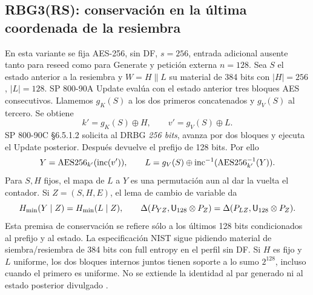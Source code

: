 \subsection{RBG3(RS): conservación en la última coordenada de la resiembra}
En esta variante se fija AES-256, sin DF, $s=256$, entrada adicional
ausente tanto para reseed como para Generate y petición externa $n=128$.
Sea $S$ el estado anterior a la resiembra y $W=H\|L$ su material de
384 bits con $|H|=256$, $|L|=128$. SP 800-90A Update evalúa con el
estado anterior tres bloques AES consecutivos. Llamemos $g_K(S)$ a
los dos primeros concatenados y $g_V(S)$ al tercero. Se obtiene
\[
 k'=g_K(S)\oplus H,\qquad v'=g_V(S)\oplus L .
\]
SP 800-90C §6.5.1.2 solicita al DRBG \emph{256 bits}, avanza por dos
bloques y ejecuta el Update posterior. Después devuelve el prefijo
de 128 bits. Por ello
\[
 Y=\operatorname{AES256}_{k'}(\operatorname{inc}(v')),\qquad
 L=g_V(S)\oplus\operatorname{inc}^{-1}(\operatorname{AES256}_{k'}^{-1}(Y)).
\]
Para $S,H$ fijos, el mapa de $L$ a $Y$ es una permutación aun al dar
la vuelta el contador. Si $Z=(S,H,E)$, el lema de cambio de variable da
\[
 H_{\min}(Y\mid Z)=H_{\min}(L\mid Z),\qquad
 \Delta(P_{YZ},\mathsf U_{128}\otimes P_Z)
 =\Delta(P_{LZ},\mathsf U_{128}\otimes P_Z).
\]
Esta premisa de conservación se refiere sólo a los últimos 128 bits
condicionados al prefijo y al estado. La especificación NIST sigue
pidiendo material de siembra/resiembra de 384 bits con full entropy en
el perfil sin DF. Si $H$ es fijo y $L$ uniforme, los dos bloques
internos juntos tienen soporte a lo sumo $2^{128}$, incluso cuando el
primero es uniforme. No se extiende la identidad al par generado ni
al estado posterior divulgado \cite[§§6.3(5), 6.5.1.2, ap. A.2, tabla 4]{nist90c}.

